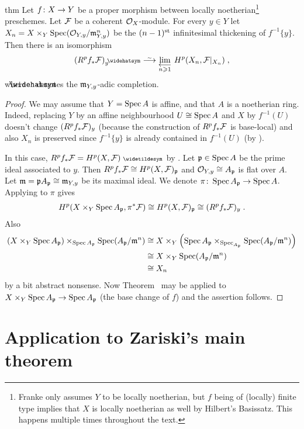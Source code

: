 \documentclass[a4paper,parskip=half,numbers=enddot, DIV=12]{scrreprt}
\renewcommand{\geq}{\geqslant}
\begin{document}
\begin{varthm}{thm}
	Let $f\colon X\morphism Y$ be a proper morphism between locally noetherian\footnote{Franke only assumes $Y$ to be locally noetherian, but $f$ being of (locally) finite type implies that $X$ is locally noetherian as well by Hilbert's Basissatz. This happens multiple times throughout the text.} preschemes. Let $\mathcal{F}$ be a coherent $\mathcal{O}_X$-module. For every $y\in Y$ let $X_n=X\times_Y\operatorname{Spec} (\mathcal{O}_{Y,y}/\mathfrak{m}_{Y,y}^n)$ be the $(n-1)^{\text{st}}$ infinitesimal thickening of $f^{-1}\{y\}$. Then there is an isomorphism
	\begin{align*}
		(R^pf_*\Ff)_y^\complete\isomorphism\limit[n\geq 1] H^p(X_n,\Ff|_{X_n})\;,
	\end{align*}
	where $\roof{\phantom{x}}$ denotes the $\mathfrak{m}_{Y,y}$-adic completion.
\end{varthm}
\begin{proof}
	We may assume that $Y=\operatorname{Spec} A$ is affine, and that $A$ is a noetherian ring. Indeed, replacing $Y$ by an affine neighbourhood $U\cong \operatorname{Spec} A$ and $X$ by $f^{-1}(U)$ doesn't change $(R^pf_*\mathcal{F})_y$ (because the construction of $R^pf_*\mathcal{F}$ is base-local) and also $X_n$ is preserved since $f^{-1}\{y\}$ is already contained in $f^{-1}(U)$ (by \cite[postnote]{alggeo2}).
	
	In this case, $R^pf_*\Ff=H^p(X,\Ff)^\qcmod$ by \cite[Proposition~1.5.1]{alggeo2}. Let $\mathfrak{p}\in\operatorname{Spec} A$ be the prime ideal associated to $y$. Then $R^pf_*\mathcal{F}\cong H^p(X,\mathcal{F})_{\mathfrak{p}}$ and $\mathcal{O}_{Y,y}\cong A_{\mathfrak{p}}$ is flat over $A$. Let $\mathfrak{m}=\mathfrak{p} A_{\mathfrak{p}}\cong \mathfrak{m}_{Y,y}$ be its maximal ideal. We denote $\pi\colon \Spec A_\pp\morphism \Spec A$. Applying \cite[Fact~4.1.1]{alggeo2} to $\pi$ gives 
	\begin{align*}
		H^p(X\times_Y\operatorname{Spec} A_{\mathfrak{p}},\pi^*\mathcal{F})\cong H^p(X,\mathcal{F})_{\mathfrak{p}}\cong (R^pf_*\mathcal{F})_y\;.
	\end{align*}
	Also
	\begin{align*}
		\left(X\times_Y\operatorname{Spec} A_{\mathfrak{p}}\right)\times_{\operatorname{Spec} A_{\mathfrak{p}}}\operatorname{Spec}(A_{\mathfrak{p}}/\mathfrak{m}^n)&\cong X\times_Y\left(\operatorname{Spec} A_{\mathfrak{p}}\times_{\operatorname{Spec}_{A_{\mathfrak{p}}}}\operatorname{Spec} (A_{\mathfrak{p}}/\mathfrak{m}^n)\right)\\
		&\cong X\times_Y\operatorname{Spec}(A_{\mathfrak{p}}/\mathfrak{m}^n)\\
		&\cong X_n
	\end{align*}
	by a bit abstract nonsense. Now Theorem~ may be applied to $X\times_Y\Spec A_\pp\morphism \Spec A_\pp$ (the base change of $f$) and the assertion follows.
\end{proof}
\section{Application to Zariski's main theorem}
\end{document}

